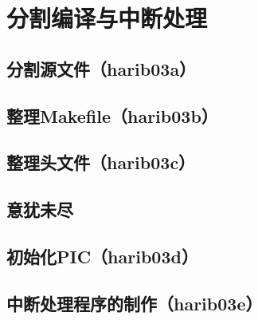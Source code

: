 ﻿\chapter{	分割编译与中断处理	}
\section{	分割源文件（harib03a）	}
\section{	整理Makefile（harib03b）	}
\section{	整理头文件（harib03c）	}
\section{	意犹未尽	}
\section{	初始化PIC（harib03d）	}
\section{	中断处理程序的制作（harib03e）	}

